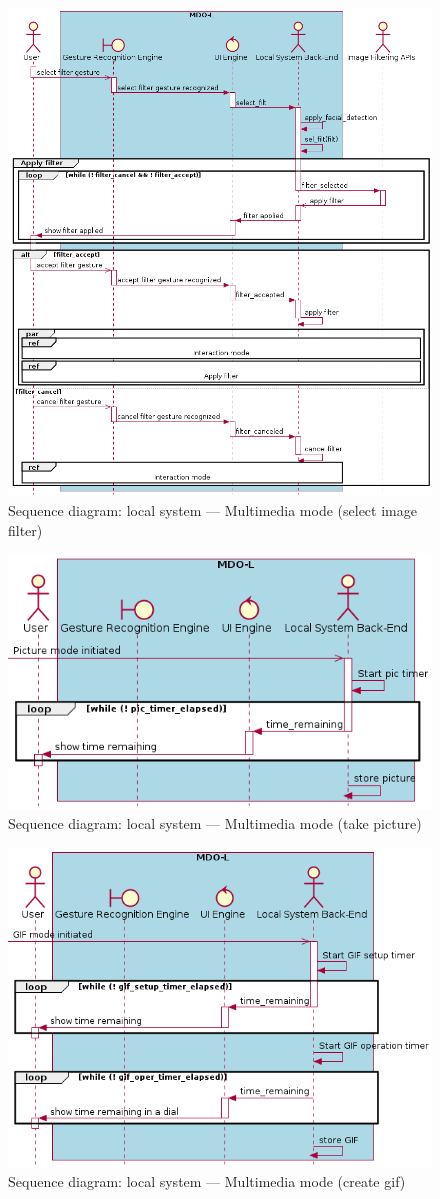 \begin{figure}[htb!]
  \centering
  \includegraphics[width=0.8\columnwidth]{./img/seq-local-multimedia-mode-sel-filt.png}
  \caption{Sequence diagram: local system --- Multimedia mode (select image filter)}%
\label{fig:seq-local-multimedia-mode-sel-filt}
\end{figure}
%
\begin{figure}[htb!]
  \centering
  \includegraphics[width=0.55\columnwidth]{./img/seq-local-multimedia-mode-take-pic.png}
  \caption{Sequence diagram: local system --- Multimedia mode (take picture)}%
\label{fig:seq-local-multimedia-mode-take-pic}
\end{figure}
%
\begin{figure}[htb!]
  \centering
  \includegraphics[width=0.55\columnwidth]{./img/seq-local-multimedia-mode-create-gif.png}
  \caption{Sequence diagram: local system --- Multimedia mode (create \gls{gif})}%
\label{fig:seq-local-multimedia-mode-create-gif}
\end{figure}
%
